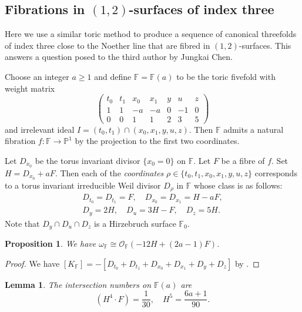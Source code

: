 \documentclass[a4paper,11pt]{amsart}
\newcommand{\FF}{\ensuremath{\mathbb{F}}}
\newcommand{\PP}{\ensuremath{\mathbb{P}}}
\def\hol{{\mathcal{O}}}
\newtheorem{lem}[thm]{Lemma}
\newtheorem{prop}[thm]{Proposition}
\theoremstyle{definition}
\theoremstyle{remark}
\numberwithin{equation}{section}
\begin{document}
\subsection{Fibrations in \texorpdfstring{$(1,2)$}{(1,2)}-surfaces of index three}\label{subsection: index 3}

Here we use a similar toric method to produce a sequence of canonical threefolds of index three close to the Noether line that are fibred in $(1,2)$-surfaces. This answers a question posed to the third author by Jungkai Chen. 

Choose an integer $a \ge 1$ and define $\FF = \FF(a)$ to be the toric fivefold with weight matrix
\begin{equation}\label{formula!index-3-weightmatrix}
\begin{pmatrix}
    t_0 & t_1 & x_0 & x_1 & y &u & z \\
    1 & 1 & -a & -a & 0 &-1 & 0 \\
    0 & 0 &  1 & 1 & 2 & 3 & 5
\end{pmatrix}
\end{equation}
and irrelevant ideal $I=(t_0,t_1) \cap (x_0,x_1,y,u,z)$. Then $\FF$ admits a natural fibration $f: \FF \to \PP^1$ by the projection to the first two coordinates.

Let $D_{x_0}$ be the torus invariant divisor $\{x_0=0\}$ on $\FF$. Let $F$ be a fibre of $f$. Set $H = D_{x_0} + aF$. Then each of the {\it coordinates} $\rho \in \{t_0,t_1,x_0,x_1,y,u,z\}$ corresponds to a torus invariant irreducible Weil divisor $D_\rho$ in $\FF$ whose class is as follows:
\begin{gather*}
	D_{t_0}=D_{t_1}=F,\quad 
	D_{x_0}=D_{x_1}=H-aF,\\
	D_y=2H,\quad 
	D_u=3H-F,\quad 
	D_z=5H.
\end{gather*}
Note that $ D_y\cap D_u \cap D_z$ is a Hirzebruch surface $\FF_0$.

\begin{prop}\label{prop!omega_F}
We have $\omega_{\FF} \cong \hol_{\FF} (-12H+(2a-1)F)$.
\end{prop}

\begin{proof}
    We have $[K_{\FF}]=-[D_{t_0} + D_{t_1}+D_{x_0} + D_{x_1} +  D_y + D_z]$ by \cite[Thm 8.2.3]{CLS}.
\end{proof}

\begin{lem} \label{lem: intersection numbers for index three}
    The intersection numbers on $\FF(a)$ are
    $$
    (H^4 \cdot F) = \frac1{30}, \quad H^5=\frac{6a+1}{90}.
    $$
\end{lem}
\end{document}
